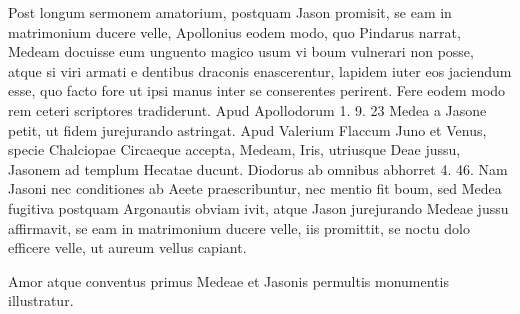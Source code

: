 \documentclass[a4paper, 11pt, oneside, polutonikogreek, german]{article}
\begin{document}
Post longum sermonem amatorium, postquam Jason promisit, se eam in matrimonium ducere velle, Apollonius eodem modo, quo Pindarus narrat, Medeam docuisse eum unguento magico usum vi boum vulnerari non posse, atque si viri armati e dentibus draconis enascerentur, lapidem iuter eos jaciendum esse, quo facto fore ut ipsi manus inter se conserentes perirent. Fere eodem modo rem ceteri scriptores tradiderunt. Apud Apollodorum 1. 9. 23 Medea a Jasone petit, ut fidem jurejurando astringat. Apud Valerium Flaccum Juno et Venus, specie Chalciopae Circaeque accepta, Medeam, Iris, utriusque Deae jussu, Jasonem ad templum Hecatae ducunt. Diodorus ab omnibus abhorret 4. 46. Nam Jasoni nec conditiones ab Aeete praescribuntur, nec mentio fit boum, sed Medea fugitiva postquam Argonautis obviam ivit, atque Jason jurejurando Medeae jussu affirmavit, se eam in matrimonium ducere velle, iis promittit, se noctu dolo efficere velle, ut aureum vellus capiant.

Amor atque conventus primus Medeae et Jasonis permultis monumentis illustratur.
\end{document}

